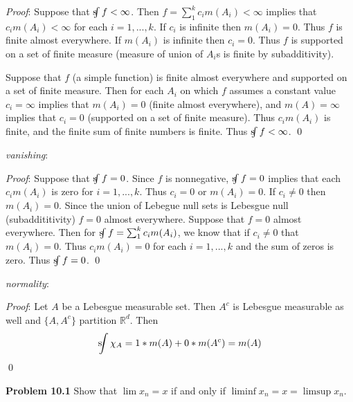 \documentclass[12pt]{article}
\newcommand{\problem}[1]{\hspace{-4 ex} \large \textbf{Problem #1} }
\newcommand{\sint}{\text{s}\kern-5pt\int}
\renewenvironment{proof}{\hspace{-4 ex} \emph{Proof}:}{\qed}
\begin{document}
	\begin{proof}
		Suppose that $\sint f < \infty$. Then $f=\sum_1^kc_i m(A_i) < \infty$ implies that $c_i m(A_i) < \infty$ for each $i=1,...,k$. If $c_i$ is infinite then $m(A_i) = 0$. Thus $f$ is finite almost everywhere. If $m(A_i)$ is infinite then $c_i = 0$. Thus $f$ is supported on a set of finite measure (measure of union of $A_i$s is finite by subadditivity).\bigbreak
		
		Suppose that $f$ (a simple function) is finite almost everywhere and supported on a set of finite measure. Then for each $A_i$ on which $f$ assumes a constant value $c_i = \infty$ implies that $m(A_i) = 0$ (finite almost everywhere), and $m(A)=\infty$ implies that $c_i=0$ (supported on a set of finite measure). Thus $c_i m(A_i)$ is finite, and the finite sum of finite numbers is finite. Thus $\sint f < \infty$.
	\end{proof}

	\hspace{-3 ex}\emph{vanishing}:
	
	\begin{proof}
		Suppose that $\sint f=0$. Since $f$ is nonnegative, $\sint f=0$ implies that each $c_i m(A_i)$ is zero for $i=1,...,k$. Thus $c_i = 0$ or $m(A_i)=0$. If $c_i \neq 0$ then $m(A_i)=0$. Since the union of Lebegue null sets is Lebesgue null (subaddititivity) $f=0$ almost everywhere. \bigbreak
		Suppose that $f=0$ almost everywhere. Then for $\sint f = \sum_1^k c_i m(A_i)$, we know that if $c_i \neq 0$ that $m(A_i) = 0$. Thus $c_i m(A_i) = 0$ for each $i=1,...,k$ and the sum of zeros is zero. Thus $\sint f = 0$.
	\end{proof}

	\hspace{-3 ex}\emph{normality}:
	
	\begin{proof}
		Let $A$ be a Lebesgue measurable set. Then $A^c$ is Lebesgue measurable as well and $\{A, A^c\}$ partition $\mathbb{R}^d$. Then $$\sint \chi_A = 1*m(A) + 0*m(A^c) = m(A)$$
	\end{proof}
	

\problem{10.1} Show that $\lim x_n=x$ if and only if $\liminf x_n=x=\limsup x_n$.
\end{document}
